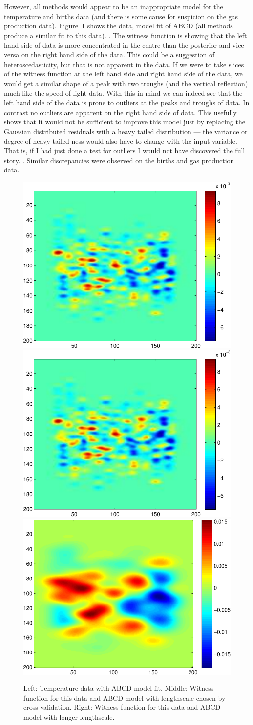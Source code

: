 \documentclass{article} %
\begin{document}
However, all methods would appear to be an inappropriate model for the temperature and births data (and there is some cause for suspicion on the gas production data).
Figure~\ref{fig:temperature-witness} shows the data, model fit of ABCD (all methods produce a similar fit to this data).
.
The witness function is showing that the left hand side of data is more concentrated in the centre than the posterior and vice versa on the right hand side of the data.
This could be a suggestion of heteroscedasticity, but that is not apparent in the data.
If we were to take slices of the witness function at the left hand side and right hand side of the data, we would get a similar shape of a peak with two troughs (and the vertical reflection) much like the speed of light data.
With this in mind we can indeed see that the left hand side of the data is prone to outliers at the peaks and troughs of data.
In contrast no outliers are apparent on the right hand side of data.
This usefully shows that it would not be sufficient to improve this model just by replacing the Gaussian distributed residuals with a heavy tailed distribution --- the variance or degree of heavy tailed ness would also have to change with the input variable.
That is, if I had just done a test for outliers I would not have discovered the full story.
.
Similar discrepancies were observed on the births and gas production data.

\begin{figure}[ht]
\centering
\includegraphics[width=0.30\columnwidth]{figures/05-temperature-detailed-witness}
\includegraphics[width=0.30\columnwidth]{figures/05-temperature-detailed-witness}
\includegraphics[width=0.30\columnwidth]{figures/05-temperature-witness}
\caption{
Left: Temperature data with ABCD model fit.
Middle: Witness function for this data and ABCD model with lengthscale chosen by cross validation.
Right: Witness function for this data and ABCD model with longer lengthscale.
}
\label{fig:temperature-witness}
\end{figure}
\end{document}
